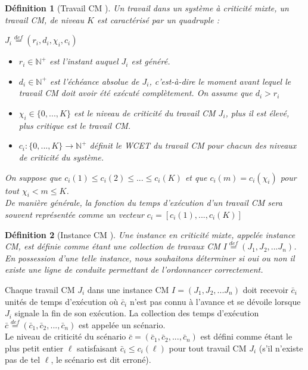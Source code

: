 \documentclass[12pt,a4paper,oneside]{book}
\theoremstyle{break}
\newtheorem{defin}{Définition}[chapter]
\theoremstyle{breakplain}
\begin{document}
\begin{defin}[Travail CM \cite{BaruahBDMSS11}]
Un travail dans un système à criticité mixte, un travail CM, de niveau $K$ est caractérisé par un quadruple : 
\begin{center}
 $J_i \overset{def}{=} (r_i, d_i, \chi_i, c_i)$ 
\end{center}
\begin{itemize}
\item $r_i \in \mathbb{N}^{+}$ est l'instant auquel $J_i$ est généré.
\item $d_i \in \mathbb{N}^{+}$ est l'échéance absolue de $J_i$, c'est-à-dire le moment avant lequel le travail CM doit avoir été exécuté complètement. On assume que $d_i > r_i$
\item $\chi_i \in \{0, ..., K\}$ est le niveau de criticité du travail CM $J_i$, plus il est élevé, plus critique est le travail CM.
\item $c_i : \{0, ..., K\} \rightarrow \mathbb{N}^{+}$ définit le WCET du travail CM pour chacun des niveaux de criticité du système.
\end{itemize}
On suppose que $c_i(1) \leq c_i(2) \leq ... \leq c_i(K)$ et que $c_i(m) = c_i(\chi_i)$ pour tout $\chi_i < m \leq K$.\\
De manière générale, la fonction du temps d'exécution d'un travail CM sera souvent représentée comme un vecteur $c_i = [c_i(1), ..., c_i(K)]$\\
\end{defin}

\begin{defin}[Instance CM \cite{baruah2010towards}]
Une instance en criticité mixte, appelée instance CM, est définie comme étant une collection de travaux CM $I \overset{def}{=} (J_1, J_2, ... J_n)$. En possession d'une telle instance, nous souhaitons déterminer si oui ou non il existe une ligne de conduite permettant de l'ordonnancer correctement.
\end{defin}

Chaque travail CM $J_i$ dans une instance CM $I = (J_1, J_2, ... J_n)$ doit recevoir $\bar{c}_i$ unités de temps d'exécution où $\bar{c}_i$ n'est pas connu à l'avance et se dévoile lorsque $J_i$ signale la fin de son exécution. La collection des temps d'exécution $\bar{c} \overset{def}{=} (\bar{c}_1, \bar{c}_2, ..., \bar{c}_n)$ est appelée un scénario.\\
Le niveau de criticité du scénario $\bar{c} = (\bar{c}_1, \bar{c}_2, ..., \bar{c}_n)$ est défini comme étant le plus petit entier $\ell$ satisfaisant $\bar{c}_i \leq c_i(\ell)$ pour tout travail CM $J_i$ (s'il n'existe pas de tel $\ell$, le scénario est dit erroné).\\
\end{document}

